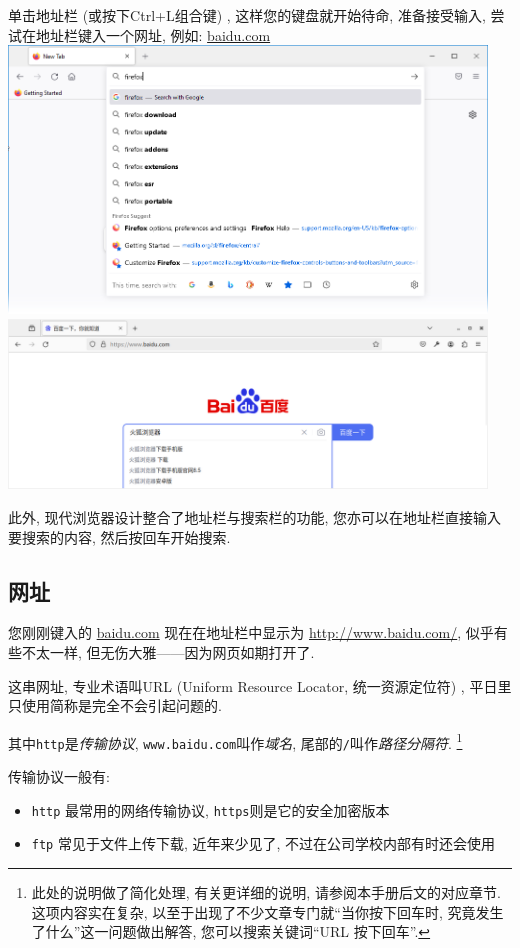 单击地址栏 (或按下Ctrl+L组合键) , 这样您的键盘就开始待命, 准备接受输入, 尝试在地址栏键入一个网址, 例如: \url{baidu.com} \\
\includegraphics[width=5in]{media/44622-Fx96 Address bar autocomplete.png} \\
\includegraphics[width=5in]{media/firefox-search-baidu.png}

此外, 现代浏览器设计整合了地址栏与搜索栏的功能, 您亦可以在地址栏直接输入要搜索的内容, 然后按回车开始搜索. 

\subsection{网址}

您刚刚键入的 \url{baidu.com} 现在在地址栏中显示为 \url{http://www.baidu.com/}, 似乎有些不太一样, 但无伤大雅------因为网页如期打开了. 

这串网址, 专业术语叫URL (Uniform Resource Locator, 统一资源定位符) , 平日里只使用简称是完全不会引起问题的. 

其中\verb|http|是\textit{传输协议}, \verb|www.baidu.com|叫作\textit{域名}, 尾部的\verb|/|叫作\textit{路径分隔符}. \footnote{此处的说明做了简化处理, 有关更详细的说明, 请参阅本手册后文的对应章节. 这项内容实在复杂, 以至于出现了不少文章专门就“当你按下回车时, 究竟发生了什么”这一问题做出解答, 您可以搜索关键词“URL 按下回车”. }

传输协议一般有: 
\begin{itemize}
    \item \verb|http| 最常用的网络传输协议, \verb|https|则是它的安全加密版本
    \item \verb|ftp| 常见于文件上传下载, 近年来少见了, 不过在公司学校内部有时还会使用
\end{itemize}

